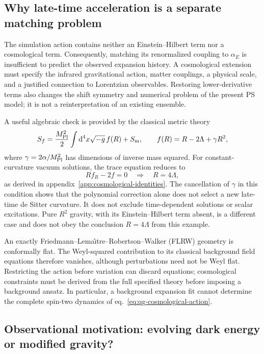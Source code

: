 \subsection{Why late-time acceleration is a separate matching problem}
\label{sec:infrared-matching}

The simulation action contains neither an Einstein--Hilbert term nor a cosmological term.  Consequently, matching its renormalized coupling to $\alpha_E$ is insufficient to predict the observed expansion history.  A cosmological extension must specify the infrared gravitational action, matter couplings, a physical scale, and a justified connection to Lorentzian observables.  Restoring lower-derivative terms also changes the shift symmetry and numerical problem of the present PS model; it is not a reinterpretation of an existing ensemble.

A useful algebraic check is provided by the classical metric theory
\begin{equation}
 S_f=\frac{M_{\rm Pl}^2}{2}\int\dd^4x\sqrt{-g}\,f(R)+S_{\rm m},
 \qquad f(R)=R-2\Lambda+\gamma R^2,
 \label{eq:quadratic-fr}
\end{equation}
where $\gamma=2\alpha/M_{\rm Pl}^2$ has dimensions of inverse mass squared.  For constant-curvature vacuum solutions, the trace equation reduces to
\begin{equation}
 R f_R-2f=0\quad\Longrightarrow\quad R=4\Lambda,
 \label{eq:constant-curvature-check}
\end{equation}
as derived in appendix~\ref{app:cosmological-identities}.  The cancellation of $\gamma$ in this condition shows that the polynomial correction alone does not select a new late-time de Sitter curvature.  It does not exclude time-dependent solutions or scalar excitations.  Pure $R^2$ gravity, with its Einstein--Hilbert term absent, is a different case and does not obey the conclusion $R=4\Lambda$ from this example.

An exactly Friedmann--Lema\^{\i}tre--Robertson--Walker (FLRW) geometry is conformally flat.  The Weyl-squared contribution to its classical background field equations therefore vanishes, although perturbations need not be Weyl flat.  Restricting the action before variation can discard equations; cosmological constraints must be derived from the full specified theory before imposing a background ansatz.  In particular, a background expansion fit cannot determine the complete spin-two dynamics of eq.~\eqref{eq:qg-cosmological-action}.

\subsection{Observational motivation: evolving dark energy or modified gravity?}
\label{sec:dark-energy-motivation}

